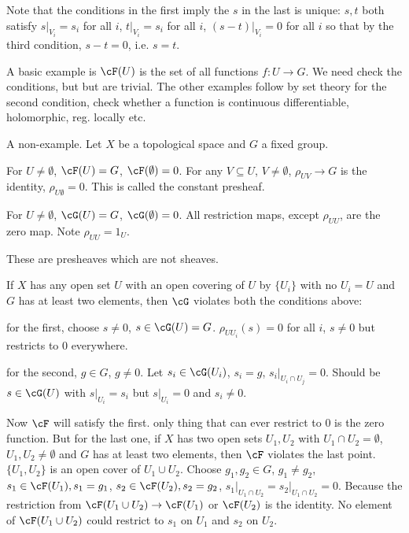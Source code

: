 Note that the conditions in the first imply the $s$ in the last is unique: $s,t$ both satisfy $s\big|_{V_i}= s_i$ for all $i$, $t\big|_{V_i}= s_i$ for all $i$, $(s-t)\big|_{V_i}= 0$ for all $i$ so that by the third condition, $s-t= 0$, i.e. $s=t$. 


\begin{ex}
A basic example is $\cF(U)$ is the set of all functions $f: U \to G$. We need check the conditions, but but are trivial. The other examples follow by set theory for the second condition, check whether a function is continuous differentiable, holomorphic, reg. locally etc.
\end{ex}


\begin{ex}
A non-example. Let $X$ be a topological space and $G$ a fixed group. 

For $U \neq \emptyset$, $\cF(U)= G$, $\cF(\emptyset)= 0$. For any $V \subseteq U$, $V \neq \emptyset$, $\rho_{UV} \to G$ is the identity, $\rho_{U \emptyset}= 0$. This is called the constant presheaf.

For $U \neq \emptyset$, $\cG(U)= G$, $\cG(\emptyset)= 0$. All restriction maps, except $\rho_{UU}$, are the zero map. Note $\rho_{UU}= 1_U$. 

These are presheaves which are not sheaves.

If $X$ has any open set $U$ with an open covering of $U$ by $\{U_i\}$ with no $U_i= U$ and $G$ has at least two elements, then $\cG$ violates both the conditions above:

for the first, choose $s \neq 0$, $s \in \cG(U)= G$. $\rho_{UU_i}(s)= 0$ for all $i$, $s \neq 0$ but restricts to 0 everywhere.

for the second, $g \in G$, $g \neq 0$. Let $s_i \in \cG(U_i)$, $s_i= g$, $s_i \big|_{U_i \cap U_j}= 0$. Should be $s \in \cG(U)$ with $s\big|_{U_i}= s_i$ but $s\big|_{U_i}= 0$ and $s_i \neq 0$. 

Now $\cF$ will satisfy the first. only thing that can ever restrict to 0 is the zero function. But for the last one, if $X$ has two open sets $U_1,U_2$ with $U_1 \cap U_2= \emptyset$, $U_1,U_2 \neq \emptyset$ and $G$ has at least two elements, then $\cF$ violates the last point. $\{U_1,U_2\}$ is an open cover of $U_1 \cup U_2$. Choose $g_1,g_2 \in G$, $g_1 \neq g_2$, $s_1 \in \cF(U_1), s_1=g_1$, $s_2 \in \cF(U_2), s_2=g_2$, $s_1 \big|_{U_1 \cap U_2}= s_2 \big|_{U_1 \cap U_2}= 0$. Because the restriction from $\cF(U_1 \cup U_2) \to \cF(U_1)$ or $\cF(U_2)$ is the identity. No element of $\cF(U_1 \cup U_2)$ could restrict to $s_1$ on $U_1$ and $s_2$ on $U_2$. 
\end{ex}


